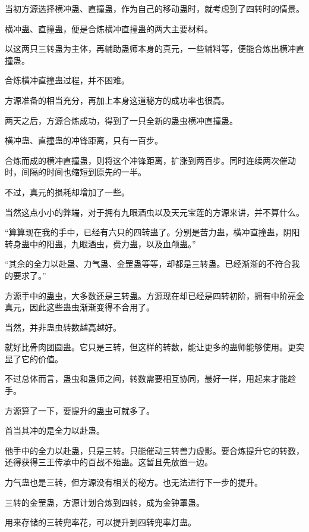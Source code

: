 
\begin{this_body}



当初方源选择横冲蛊、直撞蛊，作为自己的移动蛊时，就考虑到了四转时的情景。

横冲蛊、直撞蛊，便是合炼横冲直撞蛊的两大主要材料。

以这两只三转蛊为主体，再辅助蛊师本身的真元，一些辅料等，便能合炼出横冲直撞蛊。

合炼横冲直撞蛊过程，并不困难。

方源准备的相当充分，再加上本身这道秘方的成功率也很高。

两天之后，方源合炼成功，得到了一只全新的蛊虫横冲直撞蛊。

横冲蛊、直撞蛊的冲锋距离，只有一百步。

合炼而成的横冲直撞蛊，则将这个冲锋距离，扩涨到两百步。同时连续两次催动时，间隔的时间也缩短到原先的一半。

不过，真元的损耗却增加了一些。

当然这点小小的弊端，对于拥有九眼酒虫以及天元宝莲的方源来讲，并不算什么。

“算算现在我的手中，已经有六只的四转蛊了。分别是苦力蛊，横冲直撞蛊，阴阳转身蛊中的阳蛊，九眼酒虫，费力蛊，以及血颅蛊。”

“其余的全力以赴蛊、力气蛊、金罡蛊等等，却都是三转蛊。已经渐渐的不符合我的要求了。”

方源手中的蛊虫，大多数还是三转蛊。方源现在却已经是四转初阶，拥有中阶亮金真元，因此这些蛊虫渐渐变得不合用了。

当然，并非蛊虫转数越高越好。

就好比骨肉团圆蛊。它只是三转，但这样的转数，能让更多的蛊师能够使用。更突显了它的价值。

不过总体而言，蛊虫和蛊师之间，转数需要相互协同，最好一样，用起来才能趁手。

方源算了一下，要提升的蛊虫可就多了。

首当其冲的是全力以赴蛊。

他手中的全力以赴蛊，只是三转。只能催动三转兽力虚影。要合炼提升它的转数，还得获得三王传承中的百战不殆蛊。这暂且先放置一边。

力气蛊也是三转，但方源没有相关的秘方。也无法进行下一步的提升。

三转的金罡蛊，方源计划合炼到四转，成为金钟罩蛊。

用来存储的三转兜率花，可以提升到四转兜率灯蛊。


\end{this_body}
